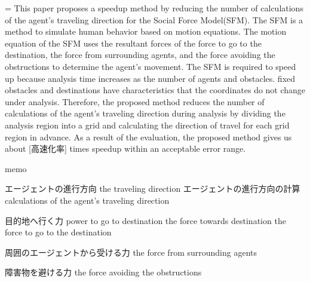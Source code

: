 ={
This paper proposes a speedup method by reducing the number of 
calculations of the agent's traveling direction for the Social Force Model(SFM).
The SFM is a method to simulate human behavior based on motion equations.
The motion equation of the SFM uses the resultant forces of the force to go to the destination,
the force from surrounding agents, and the force avoiding the obstructions to determine the agent's
movement.
The SFM is required to speed up because analysis time increases as the number of agents and obstacles.
fixed obstacles and destinations have characteristics that the coordinates do not change under analysis.
Therefore, the proposed method reduces the number of calculations of the agent's traveling direction 
during analysis by dividing the analysis region into a grid and calculating the direction of travel 
for each grid region in advance.
As a result of the evaluation, 
the proposed method gives us about [高速化率] times speedup within an acceptable error range.
}%
\fi

memo

エージェントの進行方向
the traveling direction
エージェントの進行方向の計算
calculations of the agent's traveling direction

目的地へ行く力
power to go to destination
the force towards destination
the force to go to the destination

周囲のエージェントから受ける力
the force from surrounding agents

障害物を避ける力
the force avoiding the obstructions

\fi
